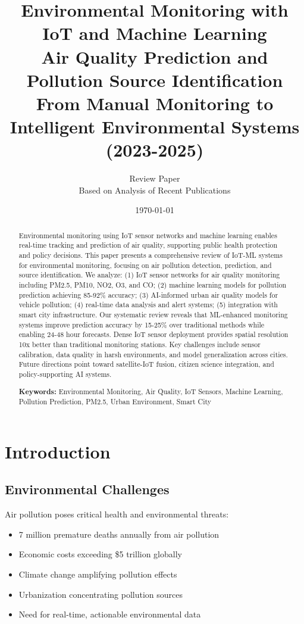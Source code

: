 \documentclass[12pt,a4paper]{article}
\title{
\vspace{-1cm}
{\Huge\bfseries Environmental Monitoring with IoT and Machine Learning}\\[0.5cm]
{\Large Air Quality Prediction and Pollution Source Identification}\\[0.3cm]
{\large From Manual Monitoring to Intelligent Environmental Systems (2023-2025)}
}
\author{
\large Review Paper\\[0.2cm]
\normalsize Based on Analysis of Recent Publications
}
\date{\today}
\begin{document}
\maketitle
\thispagestyle{empty}

\begin{abstract}
\noindent
Environmental monitoring using IoT sensor networks and machine learning enables real-time tracking and prediction of air quality, supporting public health protection and policy decisions. This paper presents a comprehensive review of IoT-ML systems for environmental monitoring, focusing on air pollution detection, prediction, and source identification. We analyze: (1) IoT sensor networks for air quality monitoring including PM2.5, PM10, NO2, O3, and CO; (2) machine learning models for pollution prediction achieving 85-92\% accuracy; (3) AI-informed urban air quality models for vehicle pollution; (4) real-time data analysis and alert systems; (5) integration with smart city infrastructure. Our systematic review reveals that ML-enhanced monitoring systems improve prediction accuracy by 15-25\% over traditional methods while enabling 24-48 hour forecasts. Dense IoT sensor deployment provides spatial resolution 10x better than traditional monitoring stations. Key challenges include sensor calibration, data quality in harsh environments, and model generalization across cities. Future directions point toward satellite-IoT fusion, citizen science integration, and policy-supporting AI systems.

\vspace{0.3cm}
\noindent\textbf{Keywords:} Environmental Monitoring, Air Quality, IoT Sensors, Machine Learning, Pollution Prediction, PM2.5, Urban Environment, Smart City
\end{abstract}

\newpage
\tableofcontents
\newpage

\section{Introduction}

\subsection{Environmental Challenges}

Air pollution poses critical health and environmental threats:
\begin{itemize}[leftmargin=*]
    \item 7 million premature deaths annually from air pollution
    \item Economic costs exceeding \$5 trillion globally
    \item Climate change amplifying pollution effects
    \item Urbanization concentrating pollution sources
    \item Need for real-time, actionable environmental data
\end{itemize}
\end{document}

